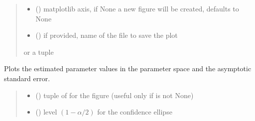 \documentclass[letterpaper,10pt,english]{sphinxmanual}
\begin{document}
\begin{fulllineitems}
\begin{fulllineitems}
\begin{quote}
\begin{description}
\begin{itemize}
\item {} 
\sphinxAtStartPar
{} (\sphinxstyleliteralemphasis{\sphinxupquote{, }}) \textendash{} matplotlib axis, if None a new figure will be created, defaults to None

\item {} 
\sphinxAtStartPar
{} () \textendash{} if provided, name of the file to save the plot

\end{itemize}

\sphinxAtStartPar
{} or a tuple 

\end{description}\end{quote}

\end{fulllineitems}


\begin{fulllineitems}
\label{\detokenize{cubmods:cubmods.cush2.CUBresCUSH2.plot_par_space}}
\pysigstartsignatures
{}
\pysigstopsignatures
\sphinxAtStartPar
Plots the estimated parameter values in the parameter space and
the asymptotic standard error.
\begin{quote}\begin{description}
\begin{itemize}
\item {} 
\sphinxAtStartPar
{} () \textendash{} tuple of  for the figure (useful only if  is not None)

\item {} 
\sphinxAtStartPar
{} () \textendash{} level \((1-\alpha/2)\) for the confidence ellipse


\end{itemize}
\end{description}
\end{quote}
\end{fulllineitems}
\end{fulllineitems}
\end{document}
